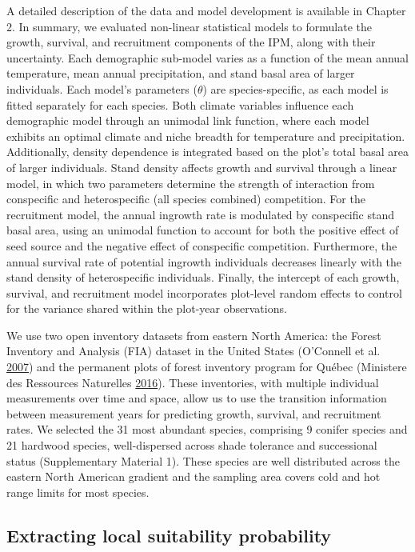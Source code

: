 \documentclass[12pt]{article}
\begin{document}
A detailed description of the data and model development is available in
Chapter 2. In summary, we evaluated non-linear statistical models to
formulate the growth, survival, and recruitment components of the IPM,
along with their uncertainty. Each demographic sub-model varies as a
function of the mean annual temperature, mean annual precipitation, and
stand basal area of larger individuals. Each model's parameters
(\(\theta\)) are species-specific, as each model is fitted separately
for each species. Both climate variables influence each demographic
model through an unimodal link function, where each model exhibits an
optimal climate and niche breadth for temperature and precipitation.
Additionally, density dependence is integrated based on the plot's total
basal area of larger individuals. Stand density affects growth and
survival through a linear model, in which two parameters determine the
strength of interaction from conspecific and heterospecific (all species
combined) competition. For the recruitment model, the annual ingrowth
rate is modulated by conspecific stand basal area, using an unimodal
function to account for both the positive effect of seed source and the
negative effect of conspecific competition. Furthermore, the annual
survival rate of potential ingrowth individuals decreases linearly with
the stand density of heterospecific individuals. Finally, the intercept
of each growth, survival, and recruitment model incorporates plot-level
random effects to control for the variance shared within the plot-year
observations.

We use two open inventory datasets from eastern North America: the
Forest Inventory and Analysis (FIA) dataset in the United States
(O'Connell et al. \protect\hyperlink{ref-OConnell2007}{2007}) and the
permanent plots of forest inventory program for Québec (Ministere des
Ressources Naturelles \protect\hyperlink{ref-Naturelles2016}{2016}).
These inventories, with multiple individual measurements over time and
space, allow us to use the transition information between measurement
years for predicting growth, survival, and recruitment rates. We
selected the 31 most abundant species, comprising 9 conifer species and
21 hardwood species, well-dispersed across shade tolerance and
successional status (Supplementary Material 1). These species are well
distributed across the eastern North American gradient and the sampling
area covers cold and hot range limits for most species.

\hypertarget{extracting-local-suitability-probability}{%
\subsection{Extracting local suitability
probability}\label{extracting-local-suitability-probability}}
\end{document}
